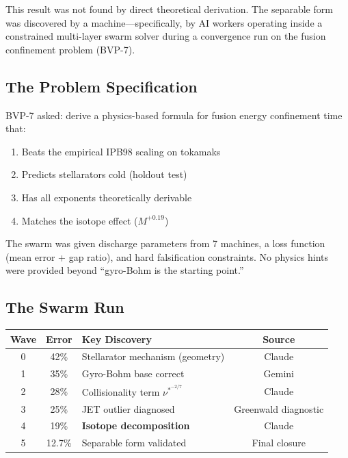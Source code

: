 \documentclass[11pt,letterpaper]{article}
\newcommand{\nustar}{\nu^*}
\begin{document}
This result was not found by direct theoretical derivation. The separable form was discovered by a machine---specifically, by AI workers operating inside a constrained multi-layer swarm solver during a convergence run on the fusion confinement problem (BVP-7).

\subsection{The Problem Specification}

BVP-7 asked: derive a physics-based formula for fusion energy confinement time that:
\begin{enumerate}[noitemsep]
\item Beats the empirical IPB98 scaling on tokamaks
\item Predicts stellarators cold (holdout test)
\item Has all exponents theoretically derivable
\item Matches the isotope effect ($M^{+0.19}$)
\end{enumerate}

The swarm was given discharge parameters from 7 machines, a loss function (mean error + gap ratio), and hard falsification constraints. No physics hints were provided beyond ``gyro-Bohm is the starting point.''

\subsection{The Swarm Run}

\begin{center}
\begin{tabular}{cclc}
\toprule
\textbf{Wave} & \textbf{Error} & \textbf{Key Discovery} & \textbf{Source} \\
\midrule
0 & 42\% & Stellarator mechanism (geometry) & Claude \\
1 & 35\% & Gyro-Bohm base correct & Gemini \\
2 & 28\% & Collisionality term $\nustar^{-2/7}$ & Claude \\
3 & 25\% & JET outlier diagnosed & Greenwald diagnostic \\
4 & 19\% & \textbf{Isotope decomposition} & Claude \\
5 & 12.7\% & Separable form validated & Final closure \\
\bottomrule
\end{tabular}
\end{center}
\end{document}
